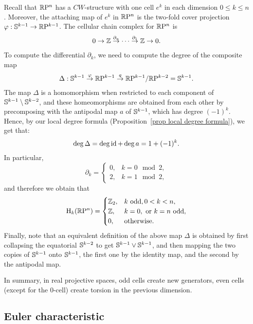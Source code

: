 \begin{example}
    Recall that $\mathbb{R}\mathrm{P}^n$ has a $CW$-structure with one cell $e^k$ in each dimension $0\leq k\leq n$. Moreover, the attaching map of $e^k$ in $\mathbb{R}\mathrm{P}^n$ is the two-fold cover projection $\varphi:\mathbb{S}^{k-1}\to \mathbb{R}\mathrm{P}^{k-1}$. The cellular chain complex for $\mathbb{R}\mathrm{P}^n$ is
    \[0\to \mathbb{Z}\overset{\partial_n}{\to}\cdots \overset{\partial_1}{\to}\mathbb{Z}\to 0.\]
    To compute the differential $\partial_k$, we need to compute the degree of the composite map
    \[\Delta:\mathbb{S}^{k-1}\overset{\varphi}{\to}\mathbb{R}\mathrm{P}^{k-1}\overset{q}{\to}\mathbb{R}\mathrm{P}^{k-1}\slash \mathbb{R}\mathrm{P}^{k-2}=\mathbb{S}^{k-1}.\]
    The map $\Delta$ is a homomorphism when restricted to each component of $\mathbb{S}^{k-1}\setminus \mathbb{S}^{k-2}$, and these homeomorphisms are obtained from each other by precomposing with the antipodal map $a$ of $\mathbb{S}^{k-1}$, which has degree $(-1)^k$. Hence, by our local degree formula (Proposition~\ref{prop local degree formula}), we get that:
    \[\deg \Delta=\deg\operatorname{id}+\deg a=1+(-1)^k.\label{eq degree of cells in RPn}\]
    In particular,
    \[\partial_k=\begin{cases}
        0,& k=0\mod 2,\\
        2,& k=1\mod 2,
    \end{cases}\]
    and therefore we obtain that
    \[
        \mathrm{H}_k(\mathbb{R}\mathrm{P}^n)=
        \begin{cases}
            \mathbb{Z}_2,& k\text{ odd}, 0<k<n,\\
            \mathbb{Z},& k=0, \text{ or }k=n \text{ odd},\\
            0,&\text{otherwise}.
        \end{cases}
    \]
    Finally, note that an equivalent definition of the above map $\Delta$ is obtained by first collapsing the equatorial $\mathbb{S}^{k-2}$ to get $\mathbb{S}^{k-1}\vee \mathbb{S}^{k-1}$, and then mapping the two copies of $\mathbb{S}^{k-1}$ onto $\mathbb{S}^{k-1}$, the first one by the identity map, and the second by the antipodal map.

    In summary, in real projective spaces, odd cells create new generators, even cells (except for the 0-cell) create torsion in the previous dimension.
\end{example}





\subsection{Euler characteristic}

